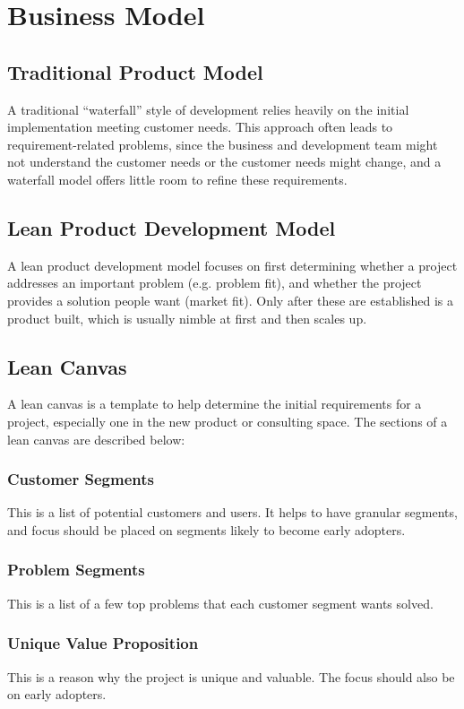 \documentclass[12pt,titlepage]{article}
\begin{document}
  \section{Business Model}
    \subsection{Traditional Product Model}
      A traditional ``waterfall'' style of development relies heavily on the initial implementation meeting customer needs. This
      approach often leads to requirement-related problems, since the business and development team might not understand the
      customer needs or the customer needs might change, and a waterfall model offers little room to refine these requirements.

    \subsection{Lean Product Development Model}
      A lean product development model focuses on first determining whether a project addresses an important problem (e.g. problem
      fit), and whether the project provides a solution people want (market fit). Only after these are established is a product built,
      which is usually nimble at first and then scales up.

    \subsection{Lean Canvas}
      A lean canvas is a template to help determine the initial requirements for a project, especially one in the new product or
      consulting space. The sections of a lean canvas are described below:

      \subsubsection{Customer Segments}
        This is a list of potential customers and users. It helps to have granular segments, and focus should be placed on segments likely
        to become early adopters.

      \subsubsection{Problem Segments}
        This is a list of a few top problems that each customer segment wants solved.

      \subsubsection{Unique Value Proposition}
        This is a reason why the project is unique and valuable. The focus should also be on early adopters.
\end{document}
